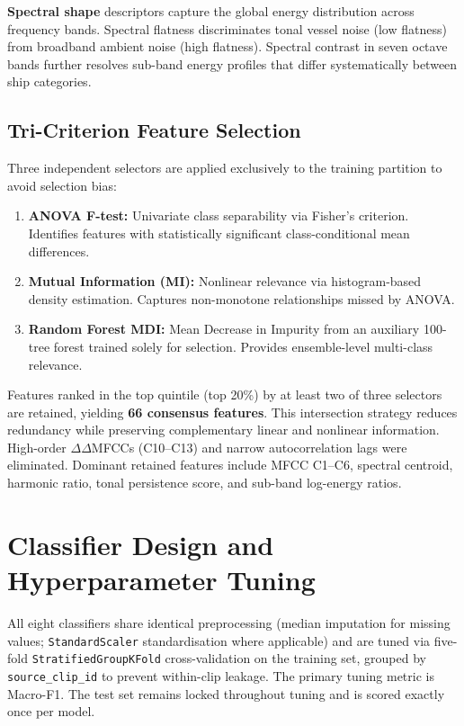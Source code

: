 \documentclass[conference]{IEEEtran}
\begin{document}
\textbf{Spectral shape} descriptors capture the global energy distribution across frequency bands. Spectral flatness discriminates tonal vessel noise (low flatness) from broadband ambient noise (high flatness). Spectral contrast in seven octave bands further resolves sub-band energy profiles that differ systematically between ship categories.

\subsection{Tri-Criterion Feature Selection}

Three independent selectors are applied exclusively to the training partition to avoid selection bias:

\begin{enumerate}
  \item \textbf{ANOVA F-test:} Univariate class separability via Fisher's criterion. Identifies features with statistically significant class-conditional mean differences.
  \item \textbf{Mutual Information (MI):} Nonlinear relevance via histogram-based density estimation. Captures non-monotone relationships missed by ANOVA.
  \item \textbf{Random Forest MDI:} Mean Decrease in Impurity from an auxiliary 100-tree forest trained solely for selection. Provides ensemble-level multi-class relevance.
\end{enumerate}

Features ranked in the top quintile (top 20\%) by at least two of three selectors are retained, yielding \textbf{66 consensus features}. This intersection strategy reduces redundancy while preserving complementary linear and nonlinear information. High-order $\Delta\Delta$MFCCs (C10--C13) and narrow autocorrelation lags were eliminated. Dominant retained features include MFCC C1--C6, spectral centroid, harmonic ratio, tonal persistence score, and sub-band log-energy ratios.

\section{Classifier Design and Hyperparameter Tuning}
\label{sec:models}

All eight classifiers share identical preprocessing (median imputation for missing values; \texttt{StandardScaler} standardisation where applicable) and are tuned via five-fold \texttt{StratifiedGroupKFold} cross-validation on the training set, grouped by \texttt{source\_clip\_id} to prevent within-clip leakage. The primary tuning metric is Macro-F1. The test set remains locked throughout tuning and is scored exactly once per model.
\end{document}
